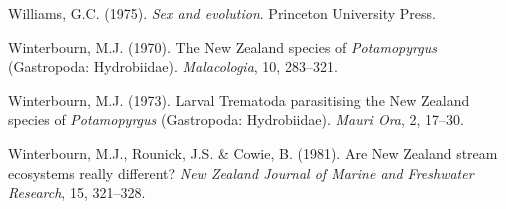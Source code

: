 \documentclass[
  letterpaper,
]{book}
\newlength{\cslhangindent}
\newenvironment{CSLReferences}[2] %
 {\begin{list}{}{%
  \setlength{\itemindent}{0pt}
  \setlength{\leftmargin}{0pt}
  \setlength{\parsep}{0pt}
  \ifodd #1
   \setlength{\leftmargin}{\cslhangindent}
   \setlength{\itemindent}{-1\cslhangindent}
  \fi
  \setlength{\itemsep}{#2\baselineskip}}}
 {\end{list}}
\begin{document}
\begin{CSLReferences}{1}{0}
Williams, G.C. (1975). \emph{Sex and evolution}. Princeton University
Press.

Winterbourn, M.J. (1970). The {New Zealand} species of
\emph{{P}otamopyrgus} ({G}astropoda: {H}ydrobiidae). \emph{Malacologia},
10, 283--321.

Winterbourn, M.J. (1973). Larval {Trematoda} parasitising the {New
Zealand} species of \emph{{P}otamopyrgus} ({G}astropoda: {H}ydrobiidae).
\emph{Mauri Ora}, 2, 17--30.

Winterbourn, M.J., Rounick, J.S. \& Cowie, B. (1981). Are {New Zealand}
stream ecosystems really different? \emph{New Zealand Journal of Marine
and Freshwater Research}, 15, 321--328.

\end{CSLReferences}


\backmatter
\end{document}
